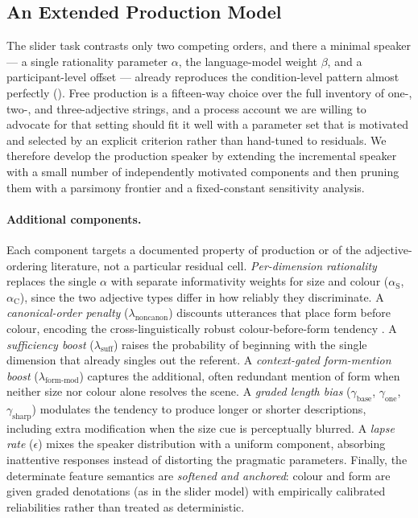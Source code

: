 \documentclass[man,floatsintext]{apa7}
\begin{document}
\subsection{An Extended Production Model}
\label{sec:model:extended}

The slider task contrasts only two competing orders, and there a minimal speaker --- a single rationality parameter $\alpha$, the language-model weight $\beta$, and a participant-level offset --- already reproduces the condition-level pattern almost perfectly ().
Free production is a fifteen-way choice over the full inventory of one-, two-, and three-adjective strings, and a process account we are willing to advocate for that setting should fit it well with a parameter set that is motivated and selected by an explicit criterion rather than hand-tuned to residuals.
We therefore develop the production speaker by extending the incremental speaker with a small number of independently motivated components and then pruning them with a parsimony frontier and a fixed-constant sensitivity analysis.

\paragraph{Additional components.}
Each component targets a documented property of production or of the adjective-ordering literature, not a particular residual cell.
\emph{Per-dimension rationality} replaces the single $\alpha$ with separate informativity weights for size and colour ($\alpha_\text{S}$, $\alpha_\text{C}$), since the two adjective types differ in how reliably they discriminate.
A \emph{canonical-order penalty} ($\lambda_\text{noncanon}$) discounts utterances that place form before colour, encoding the cross-linguistically robust colour-before-form tendency \citep{sproat1991cross, cinque1994, scott2002}.
A \emph{sufficiency boost} ($\lambda_\text{suff}$) raises the probability of beginning with the single dimension that already singles out the referent.
A \emph{context-gated form-mention boost} ($\lambda_\text{form-mod}$) captures the additional, often redundant mention of form when neither size nor colour alone resolves the scene.
A \emph{graded length bias} ($\gamma_\text{base}$, $\gamma_\text{one}$, $\gamma_\text{sharp}$) modulates the tendency to produce longer or shorter descriptions, including extra modification when the size cue is perceptually blurred.
A \emph{lapse rate} ($\epsilon$) mixes the speaker distribution with a uniform component, absorbing inattentive responses instead of distorting the pragmatic parameters.
Finally, the determinate feature semantics are \emph{softened and anchored}: colour and form are given graded denotations (as in the slider model) with empirically calibrated reliabilities rather than treated as deterministic.
\end{document}
